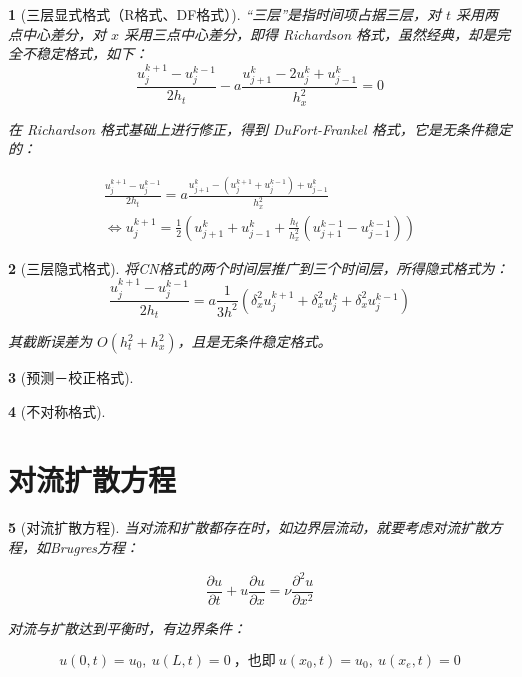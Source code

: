 \documentclass[zihao=5,UTF8]{report}
\theoremstyle{MyTheoremStyle} %
\theoremstyle{MySubsubsectionStyle} %
\newtheorem{definition}{}
\begin{document}
\begin{definition}[三层显式格式（R格式、DF格式）]
“三层”是指时间项占据三层，对 $t$ 采用两点中心差分，对 $x$ 采用三点中心差分，即得 Richardson 格式，虽然经典，却是完全不稳定格式，如下：
\begin{equation}
    \frac{u_j^{k+1}-u_j^{k-1}}{2h_t}-a\frac{u_{j+1}^k-2u_j^k+u_{j-1}^k}{h_x^2}=0
\end{equation}

在 Richardson 格式基础上进行修正，得到 DuFort-Frankel 格式，它是无条件稳定的：

\begin{gather}
    \frac{u_{j}^{k+1} - u_{j}^{k-1}}{2h_t}=a\frac{u_{j+1}^{k}-(u_{j}^{k+1}+u_{j}^{k-1})+u_{j-1}^{k}}{h_x^2} \\ 
    \Longleftrightarrow    u_{j}^{k+1} = \frac{1}{2} \left(u_{j+1}^k + u_{j-1}^k + \frac{h_t}{h_x^2}(u_{j+1}^{k-1} - u_{j-1}^{k-1}) \right)
\end{gather}

\end{definition}


\begin{definition}[三层隐式格式]

将CN格式的两个时间层推广到三个时间层，所得隐式格式为：
\begin{equation}
    \frac{u_j^{k+1}-u_j^{k-1}}{2h_t}=a\frac{1}{3h^2}(\delta_x^2u_j^{k+1}+\delta_x^2u_j^k+\delta_x^2u_j^{k-1})
\end{equation}

其截断误差为 $O(h_t^2 + h_x^2)$，且是无条件稳定格式。

\end{definition}


\begin{definition}[预测－校正格式]
\end{definition}


\begin{definition}[不对称格式]
\end{definition}


\section{对流扩散方程}


\begin{definition}[对流扩散方程]

当对流和扩散都存在时，如边界层流动，就要考虑对流扩散方程，如Brugres方程：

\begin{equation}
    \frac{\partial u}{\partial t}+u\frac{\partial u}{\partial x}=\nu\frac{\partial^{2}u}{\partial x^{2}}
\end{equation}

对流与扩散达到平衡时，有边界条件：

\begin{equation}
    u(0,t)=u_{0},\ u(L,t)=0\ \text{，也即} \ u(x_0,t)=u_{0},\ u(x_e,t)=0
\end{equation}

\end{definition}
\end{document}
